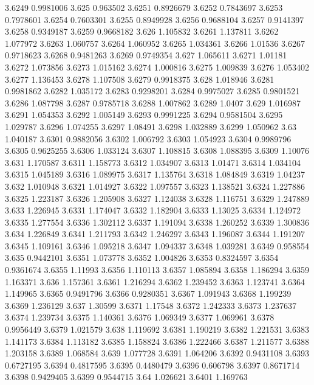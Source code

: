 3.6249  0.9981006
3.625  0.963502
3.6251  0.8926679
3.6252  0.7843697
3.6253  0.7978601
3.6254  0.7603301
3.6255  0.8949928
3.6256  0.9688104
3.6257  0.9141397
3.6258  0.9349187
3.6259  0.9668182
3.626  1.105832
3.6261  1.137811
3.6262  1.077972
3.6263  1.060757
3.6264  1.060952
3.6265  1.034361
3.6266  1.01536
3.6267  0.9718623
3.6268  0.9481263
3.6269  0.9749354
3.627  1.065611
3.6271  1.01181
3.6272  1.073856
3.6273  1.015162
3.6274  1.000816
3.6275  1.009839
3.6276  1.053402
3.6277  1.136453
3.6278  1.107508
3.6279  0.9918375
3.628  1.018946
3.6281  0.9981862
3.6282  1.035172
3.6283  0.9298201
3.6284  0.9975027
3.6285  0.9801521
3.6286  1.087798
3.6287  0.9785718
3.6288  1.007862
3.6289  1.0407
3.629  1.016987
3.6291  1.054353
3.6292  1.005149
3.6293  0.9991225
3.6294  0.9581504
3.6295  1.029787
3.6296  1.074255
3.6297  1.08491
3.6298  1.032889
3.6299  1.050962
3.63  1.040187
3.6301  0.9882056
3.6302  1.006792
3.6303  1.054923
3.6304  0.9989796
3.6305  0.9625255
3.6306  1.033124
3.6307  1.108815
3.6308  1.088395
3.6309  1.10076
3.631  1.170587
3.6311  1.158773
3.6312  1.034907
3.6313  1.01471
3.6314  1.034104
3.6315  1.045189
3.6316  1.089975
3.6317  1.135764
3.6318  1.084849
3.6319  1.04237
3.632  1.010948
3.6321  1.014927
3.6322  1.097557
3.6323  1.138521
3.6324  1.227886
3.6325  1.223187
3.6326  1.205908
3.6327  1.124038
3.6328  1.116751
3.6329  1.247889
3.633  1.226945
3.6331  1.174047
3.6332  1.182904
3.6333  1.13025
3.6334  1.124972
3.6335  1.277554
3.6336  1.302112
3.6337  1.191094
3.6338  1.260252
3.6339  1.300836
3.634  1.226849
3.6341  1.211793
3.6342  1.246297
3.6343  1.196087
3.6344  1.191207
3.6345  1.109161
3.6346  1.095218
3.6347  1.094337
3.6348  1.039281
3.6349  0.958554
3.635  0.9442101
3.6351  1.073778
3.6352  1.004826
3.6353  0.8324597
3.6354  0.9361674
3.6355  1.11993
3.6356  1.110113
3.6357  1.085894
3.6358  1.186294
3.6359  1.163371
3.636  1.157361
3.6361  1.216294
3.6362  1.239452
3.6363  1.123741
3.6364  1.149965
3.6365  0.9491796
3.6366  0.9280351
3.6367  1.091943
3.6368  1.199239
3.6369  1.236129
3.637  1.30599
3.6371  1.17548
3.6372  1.242333
3.6373  1.237637
3.6374  1.239734
3.6375  1.140361
3.6376  1.069349
3.6377  1.069961
3.6378  0.9956449
3.6379  1.021579
3.638  1.119692
3.6381  1.190219
3.6382  1.221531
3.6383  1.141173
3.6384  1.113182
3.6385  1.158824
3.6386  1.222466
3.6387  1.211577
3.6388  1.203158
3.6389  1.068584
3.639  1.077728
3.6391  1.064206
3.6392  0.9431108
3.6393  0.6727195
3.6394  0.4817595
3.6395  0.4480479
3.6396  0.606798
3.6397  0.8671714
3.6398  0.9429405
3.6399  0.9544715
3.64  1.026621
3.6401  1.169763
